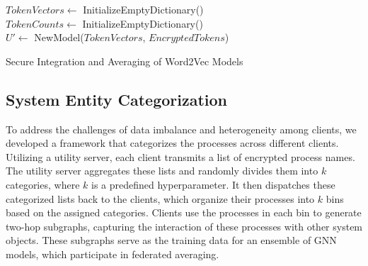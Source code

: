 \begin{algorithm}[!t]
  \scriptsize
  \DontPrintSemicolon
  \BlankLine
  $TokenVectors \leftarrow$ InitializeEmptyDictionary()\\
  $TokenCounts \leftarrow$ InitializeEmptyDictionary()\\
  $U' \leftarrow$ NewModel($TokenVectors$, $EncryptedTokens$) 
  \BlankLine
  \\
  \BlankLine
  \caption{Secure Integration and Averaging of Word2Vec Models}
  \label{alg:secure_integration_averaging_word2vec}
\end{algorithm}

\subsection{System Entity Categorization}
To address the challenges of data imbalance and heterogeneity among clients, we developed a framework that categorizes the processes across different clients. Utilizing a utility server, each client transmits a list of encrypted process names. The utility server aggregates these lists and randomly divides them into \(k\) categories, where \(k\) is a predefined hyperparameter. It then dispatches these categorized lists back to the clients, which organize their processes into \(k\) bins based on the assigned categories. Clients use the processes in each bin to generate two-hop subgraphs, capturing the interaction of these processes with other system objects. These subgraphs serve as the training data for an ensemble of GNN models, which participate in federated averaging.

